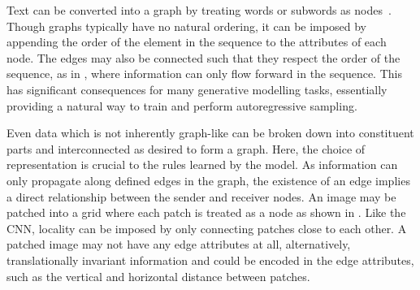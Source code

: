 Text can be converted into a graph by treating words or subwords as nodes~.
Though graphs typically have no natural ordering, it can be imposed by appending the order of the element in the sequence to the attributes of each node.
The edges may also be connected such that they respect the order of the sequence, as in , where information can only flow forward in the sequence.
This has significant consequences for many generative modelling tasks, essentially providing a natural way to train and perform autoregressive sampling.

Even data which is not inherently graph-like can be broken down into constituent parts and interconnected as desired to form a graph.
Here, the choice of representation is crucial to the rules learned by the model.
As information can only propagate along defined edges in the graph, the existence of an edge implies a direct relationship between the sender and receiver nodes.
An image may be patched into a grid where each patch is treated as a node as shown in .
Like the CNN, locality can be imposed by only connecting patches close to each other.
A patched image may not have any edge attributes at all, alternatively, translationally invariant information and could be encoded in the edge attributes, such as the vertical and horizontal distance between patches.


